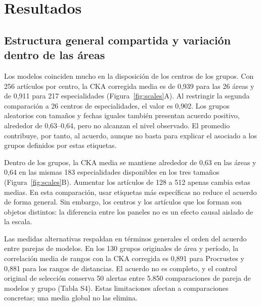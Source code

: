 \documentclass[12pt]{article}
\begin{document}
\section{Resultados}
\subsection{Estructura general compartida y variación dentro de las áreas}
Los modelos coinciden mucho en la disposición de los centros de los grupos. Con 256 artículos por centro, la CKA corregida media es de 0,939 para las 26 áreas y de 0,911 para 217 especialidades (Figura~\ref{fig:scales}A). Al restringir la segunda comparación a 26 centros de especialidades, el valor es 0,902. Los grupos aleatorios con tamaños y fechas iguales también presentan acuerdo positivo, alrededor de 0,63--0,64, pero no alcanzan el nivel observado. El promedio contribuye, por tanto, al acuerdo, aunque no basta para explicar el asociado a los grupos definidos por estas etiquetas.

Dentro de los grupos, la CKA media se mantiene alrededor de 0,63 en las áreas y 0,64 en las mismas 183 especialidades disponibles en los tres tamaños (Figura~\ref{fig:scales}B). Aumentar los artículos de 128 a 512 apenas cambia estas medias. En esta comparación, usar etiquetas más específicas no reduce el acuerdo de forma general. Sin embargo, los centros y los artículos que los forman son objetos distintos: la diferencia entre los paneles no es un efecto causal aislado de la escala.

Las medidas alternativas respaldan en términos generales el orden del acuerdo entre parejas de modelos. En los 130 grupos originales de área y período, la correlación media de rangos con la CKA corregida es 0,891 para Procrustes y 0,881 para los rangos de distancias. El acuerdo no es completo, y el control original de selección conserva 50 alertas entre 5.850 comparaciones de pareja de modelos y grupo (Tabla S4). Estas limitaciones afectan a comparaciones concretas; una media global no las elimina.
\end{document}
